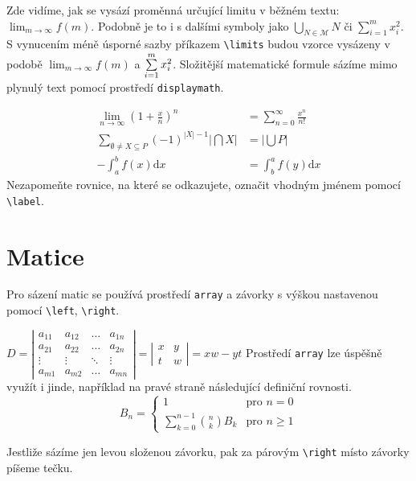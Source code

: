 \documentclass[a4paper,11pt,twocolumn]{article}
\begin{document}
Zde vidíme, jak se vysází proměnná určující limitu v běžném textu: $\lim_{m\rightarrow\infty}f(m)$.
Podobně je to i s dalšími symboly jako $\bigcup_{N\in\mathcal{M}}N$ či $\sum^{m}_{i=1}x^2_i$.
S vynucením méně úsporné sazby příkazem \verb|\limits| budou vzorce vysázeny v podobě $
\lim_{m\rightarrow\infty}\limits f(m)$ a $\sum^{m}_{i=1}\limits x^2_i$.
Složitější matematické formule sázíme mimo plynulý text pomocí prostředí \texttt{displaymath}.

\begin{align}
    \lim_{n\rightarrow\infty}\left(1+\frac{x}{n}\right)^n &= \sum^{\infty}_{n=0}\frac{x^n}{n!} \\
    \sum_{\emptyset \ne X \subseteq P}(-1)^{|X|-1} \left|\bigcap X\right| &= \left| \bigcup P \right| \\ 
    - \int^{b}_{a}f(x)\mathrm{d}x &= \int^a_b f(y)\mathrm{d}x \label{eq:7}
\end{align}
Nezapomeňte rovnice, na které se odkazujete, označit vhodným jménem pomocí \verb|\label|.

\section{Matice}
Pro sázení matic se používá prostředí \texttt{array} a závorky s výškou nastavenou pomocí
\verb|\left|, \verb|\right|.

$D = \left| \begin{array}{cccc}
     a_{11} & a_{12} & \dots & a_{1n} \\
     a_{21} & a_{22} & \dots & a_{2n} \\
     \vdots & \vdots & \ddots & \vdots \\
     a_{m1} & a_{m2} & \dots & a_{mn} 
\end{array} \right| 
= 
\left|
\begin{array}{cc}
     x & y \\
     t & w
\end{array}
\right|
=
xw-yt
$
Prostředí \verb|array| lze úspěšně využít i jinde,
například na pravé straně následující definiční rovnosti.
\[
B_n =
\left\{
\begin{array}{ll}
1 & \text{pro } n = 0 \\[10pt]
\sum\limits_{k=0}^{n-1} \binom{n}{k} B_k & \text{pro } n \geq 1
\end{array}
\right.
\]

Jestliže sázíme jen levou složenou závorku, pak za párovým \verb|\right|
místo závorky píšeme tečku.
\end{document}
